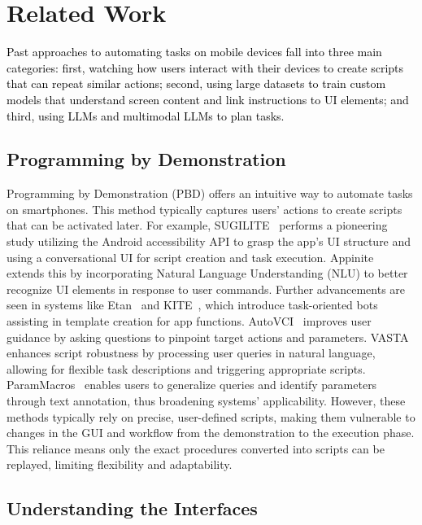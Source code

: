 \section{Related Work}

\textcolor{black}{Past approaches to automating tasks on mobile devices fall into three main categories: first, watching how users interact with their devices to create scripts that can repeat similar actions; second, using large datasets to train custom models that understand screen content and link instructions to UI elements; and third, using LLMs and multimodal LLMs to plan tasks.}

\subsection{Programming by Demonstration}

Programming by Demonstration (PBD) offers an intuitive way to automate tasks on smartphones. This method typically captures users' actions to create scripts that can be activated later. For example, SUGILITE~\cite{li2017sugilite} performs a pioneering study utilizing the Android accessibility API to grasp the app's UI structure and using a conversational UI for script creation and task execution. Appinite~\cite{li2018appinite} extends this by incorporating Natural Language Understanding (NLU) to better recognize UI elements in response to user commands. Further advancements are seen in systems like Etan~\cite{riva2021etna} and KITE~\cite{li2018kite}, which introduce task-oriented bots assisting in template creation for app functions. AutoVCI~\cite{pan2022automatically} improves user guidance by asking questions to pinpoint target actions and parameters. VASTA~\cite{sereshkeh2020vasta} enhances script robustness by processing user queries in natural language, allowing for flexible task descriptions and triggering appropriate scripts. ParamMacros~\cite{krosnick2022parammacros} enables users to generalize queries and identify parameters through text annotation, thus broadening systems' applicability. However, these methods typically rely on precise, user-defined scripts, making them vulnerable to changes in the GUI and workflow from the demonstration to the execution phase. This reliance means only the exact procedures converted into scripts can be replayed, limiting flexibility and adaptability.

\subsection{Understanding the Interfaces}


